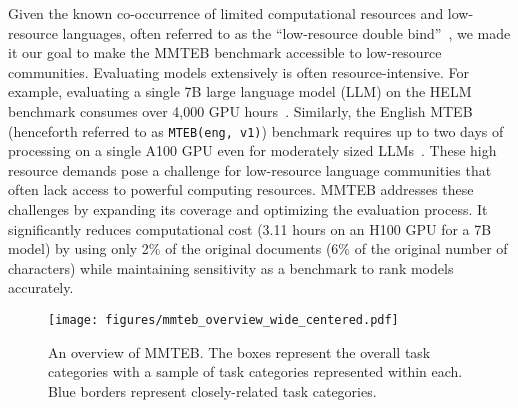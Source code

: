 Given the known co-occurrence of limited computational resources and low-resource languages, often referred to as the ``low-resource double bind''~\citep{ahia-etal-2021-low-resource}, we made it our goal to make the MMTEB benchmark accessible to low-resource communities.
Evaluating models extensively is often resource-intensive. For example, evaluating a single 7B large language model (LLM) on the HELM benchmark consumes over 4,000 GPU hours~\citep{liang2022holistic}.
Similarly, the English MTEB (henceforth referred to as \texttt{MTEB(eng, v1)}) benchmark requires up to two days of processing on a single A100 GPU even for moderately sized LLMs~\citep{muennighoff2023mteb, behnamghader2024llm2vec}. These high resource demands pose a challenge for low-resource language communities that often lack access to powerful computing resources. MMTEB addresses these challenges by expanding its coverage and optimizing the evaluation process. It significantly reduces computational cost (3.11 hours on an H100 GPU for a 7B model) by using only 2\% of the original documents (6\% of the original number of characters) while maintaining sensitivity as a benchmark to rank models accurately.

\begin{figure*}
    \centering
    \texttt{[image: figures/mmteb\_overview\_wide\_centered.pdf]}
    \caption{An overview of MMTEB. The boxes represent the overall task categories with a sample of task categories represented within each. Blue borders represent closely-related task categories.}
    \label{fig:overview}
    \vspace{-1.5mm}
\end{figure*}